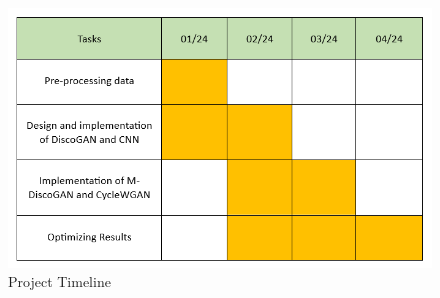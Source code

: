 \documentclass[12pt,a4paper]{article}
\begin{document}
\begin{figure}[htb!]
  \centering
\includegraphics[scale = 0.85]{timeline-chart.png}
  \caption{Project Timeline}
  \label{fig:cycleWGAN}
\end{figure}
\end{document}
